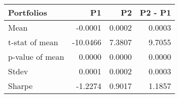 \begin{tabular}{lrrr}
\toprule
Portfolios & P1 & P2 & P2 - P1 \\
\midrule
Mean & -0.0001 & 0.0002 & 0.0003 \\
t-stat of mean & -10.0466 & 7.3807 & 9.7055 \\
p-value of mean & 0.0000 & 0.0000 & 0.0000 \\
Stdev & 0.0001 & 0.0002 & 0.0003 \\
Sharpe & -1.2274 & 0.9017 & 1.1857 \\
\bottomrule
\end{tabular}
